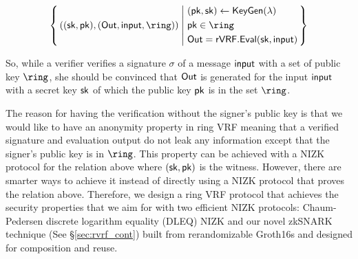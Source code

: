$$ \Setst{ ((\sk, \pk),(\Out, \msg, \ring))}{
    \eprint{
        (\pk,\sk) \leftarrow \rVRF.\KeyGen(\secparam), \quad %
        \pk \in \ring, \quad
        \Out = \rVRF.\Eval(\sk,\msg)
    }{
        \begin{aligned}
        & (\pk,\sk) \leftarrow \KeyGen(\secparam) \\
        & \pk \in \ring \\
        & \Out = \rVRF.\Eval(\sk,\msg)
        \end{aligned}
    }
} $$

So, while a verifier verifies a signature $ \sigma $ of a message $ \mathsf{input} $ with a set of public key $ \ring $, she should be convinced that $ {\mathsf{Out}} $ is generated for the input $ \mathsf{input} $ with a secret key $ \mathsf{sk} $ of which the  public key $ \mathsf{pk} $ is in the set  $ \ring $. 

 The reason for having the verification without the signer's public key is that we would like to have an anonymity property in ring VRF meaning that a verified signature and evaluation output do not leak any information except that the signer's public key is in $ \ring $.
This property can be achieved with a NIZK protocol for the relation above where $ (\mathsf{sk},\mathsf{pk}) $ is the witness. However, there are smarter ways to achieve it instead of directly using a NIZK protocol that proves the relation above. Therefore, we design a ring VRF protocol that achieves the security properties that we aim for with two efficient NIZK protocols: Chaum-Pedersen discrete logarithm equality (DLEQ) NIZK and our novel zkSNARK technique (See \S\ref{sec:rvrf_cont}) built from
rerandomizable Groth16s \cite{Groth16} and designed for composition and reuse.




